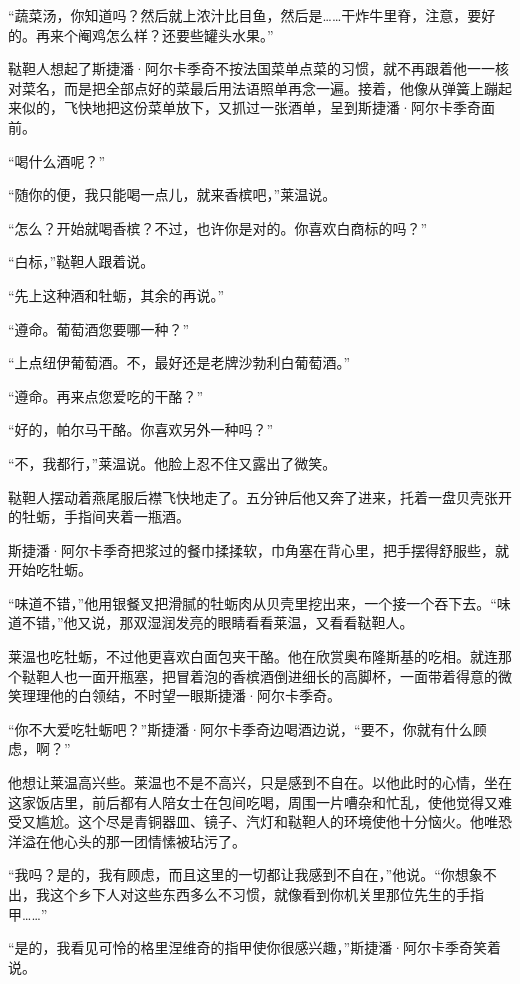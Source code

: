 \par “蔬菜汤，你知道吗？然后就上浓汁比目鱼，然后是……干炸牛里脊，注意，要好的。再来个阉鸡怎么样？还要些罐头水果。”
\par 鞑靼人想起了斯捷潘·阿尔卡季奇不按法国菜单点菜的习惯，就不再跟着他一一核对菜名，而是把全部点好的菜最后用法语照单再念一遍。接着，他像从弹簧上蹦起来似的，飞快地把这份菜单放下，又抓过一张酒单，呈到斯捷潘·阿尔卡季奇面前。
\par “喝什么酒呢？”
\par “随你的便，我只能喝一点儿，就来香槟吧，”莱温说。
\par “怎么？开始就喝香槟？不过，也许你是对的。你喜欢白商标的吗？”
\par “白标，”鞑靼人跟着说。
\par “先上这种酒和牡蛎，其余的再说。”
\par “遵命。葡萄酒您要哪一种？”
\par “上点纽伊葡萄酒。不，最好还是老牌沙勃利白葡萄酒。”
\par “遵命。再来点您爱吃的干酪？”
\par “好的，帕尔马干酪。你喜欢另外一种吗？”
\par “不，我都行，”莱温说。他脸上忍不住又露出了微笑。
\par 鞑靼人摆动着燕尾服后襟飞快地走了。五分钟后他又奔了进来，托着一盘贝壳张开的牡蛎，手指间夹着一瓶酒。
\par 斯捷潘·阿尔卡季奇把浆过的餐巾揉揉软，巾角塞在背心里，把手摆得舒服些，就开始吃牡蛎。
\par “味道不错，”他用银餐叉把滑腻的牡蛎肉从贝壳里挖出来，一个接一个吞下去。“味道不错，”他又说，那双湿润发亮的眼睛看看莱温，又看看鞑靼人。
\par 莱温也吃牡蛎，不过他更喜欢白面包夹干酪。他在欣赏奥布隆斯基的吃相。就连那个鞑靼人也一面开瓶塞，把冒着泡的香槟酒倒进细长的高脚杯，一面带着得意的微笑理理他的白领结，不时望一眼斯捷潘·阿尔卡季奇。
\par “你不大爱吃牡蛎吧？”斯捷潘·阿尔卡季奇边喝酒边说，“要不，你就有什么顾虑，啊？”
\par 他想让莱温高兴些。莱温也不是不高兴，只是感到不自在。以他此时的心情，坐在这家饭店里，前后都有人陪女士在包间吃喝，周围一片嘈杂和忙乱，使他觉得又难受又尴尬。这个尽是青铜器皿、镜子、汽灯和鞑靼人的环境使他十分恼火。他唯恐洋溢在他心头的那一团情愫被玷污了。
\par “我吗？是的，我有顾虑，而且这里的一切都让我感到不自在，”他说。“你想象不出，我这个乡下人对这些东西多么不习惯，就像看到你机关里那位先生的手指甲……”
\par “是的，我看见可怜的格里涅维奇的指甲使你很感兴趣，”斯捷潘·阿尔卡季奇笑着说。
